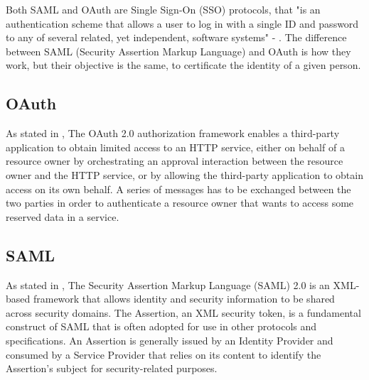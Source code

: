 Both SAML and OAuth are Single Sign-On (SSO) protocols, that "is an authentication scheme that allows a user to log in with a single ID and password to any of several related, yet independent, software systems" - \cite{wikipedia_sso}. 
The difference between SAML (Security Assertion Markup Language) and OAuth is how they work, but their objective is the same, to certificate the identity of a given person.

\subsection{OAuth}
As stated in \cite{ietf_oauth2}, The OAuth 2.0 authorization framework enables a third-party application to obtain limited access to an HTTP service, either on behalf of a resource owner by orchestrating an approval interaction between the resource owner and the HTTP service, or by allowing the third-party application to obtain access on its own behalf.
A series of messages has to be exchanged between the two parties in order to authenticate a resource owner that wants to access some reserved data in a service.

\subsection{SAML}
As stated in \cite{ietf_SAML}, The Security Assertion Markup Language (SAML) 2.0 is an XML-based framework that allows identity and security information to be shared across security domains. The Assertion, an XML security token, is a fundamental construct of SAML that is often adopted for use in other protocols and specifications. An Assertion is generally issued by an Identity Provider and consumed by a Service Provider that relies on its content to identify the Assertion's subject for security-related purposes.





